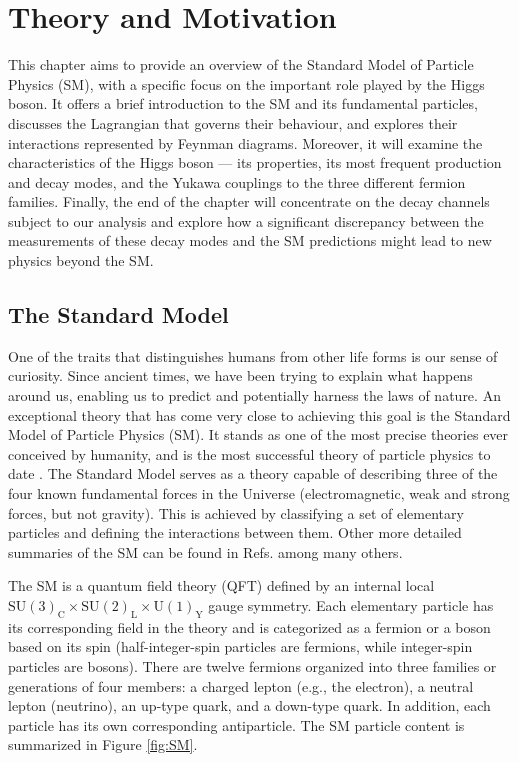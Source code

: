\chapter[Theory and Motivation]{Theory and Motivation}\label{chap:theory_motivation}

This chapter aims to provide an overview of the Standard Model of Particle Physics (SM), with a specific focus on the important role played by the Higgs boson. It offers a brief introduction to the SM and its fundamental particles, discusses the Lagrangian that governs their behaviour, and explores their interactions represented by Feynman diagrams. Moreover, it will examine the characteristics of the Higgs boson --- its properties, its most frequent production and decay modes, and the Yukawa couplings to the three different fermion families. Finally, the end of the chapter will concentrate on the decay channels subject to our analysis and explore how a significant discrepancy between the measurements of these decay modes and the SM predictions might lead to new physics beyond the SM.

\section{The Standard Model}\label{sec:SM}

One of the traits that distinguishes humans from other life forms is our sense of curiosity. Since ancient times, we have been trying to explain what happens around us, enabling us to predict and potentially harness the laws of nature. An exceptional theory that has come very close to achieving this goal is the Standard Model of Particle Physics (SM). It stands as one of the most precise theories ever conceived by humanity, and is the most successful theory of particle physics to date \cite{osti_22251333}. The Standard Model serves as a theory capable of describing three of the four known fundamental forces in the Universe (electromagnetic, weak and strong forces, but not gravity). This is achieved by classifying a set of elementary particles and defining the interactions between them. Other more detailed summaries of the SM can be found in Refs. \cite{Perkins:1982xb, Peskin:1995ev, Schwartz:2014sze} among many others.

The SM is a quantum field theory (QFT) defined by an internal local $\text{SU}(3)_{\text{C}}\times \text{SU}(2)_{\text{L}}\times \text{U}(1)_{\text{Y}}$ gauge symmetry. Each elementary particle has its corresponding field in the theory and is categorized as a fermion or a boson based on its spin (half-integer-spin particles are fermions, while integer-spin particles are bosons). There are twelve fermions organized into three families or generations of four members: a charged lepton (e.g., the electron), a neutral lepton (neutrino), an up-type quark, and a down-type quark. In addition, each particle has its own corresponding antiparticle. The SM particle content is summarized in Figure \ref{fig:SM}.

